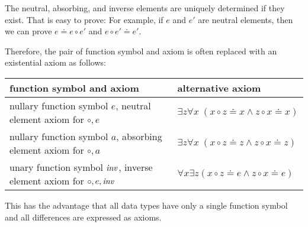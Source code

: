 \begin{remark}[Uniqueness]\label{rem:binaryfunc:unique}
The neutral, absorbing, and inverse elements are uniquely determined if they exist.
That is easy to prove: For example, if $e$ and $e'$ are neutral elements, then we can prove $e\doteq e\circ e'$ and $e\circ e'\doteq e'$.

Therefore, the pair of function symbol and axiom is often replaced with an existential axiom as follows:
 \begin{center}
  \begin{tabular}{|l|l|}
   \hline
   function symbol and axiom & alternative axiom \\
   \hline
   nullary function symbol $e$, neutral element axiom for $\circ,e$    & $\exists z \forall x\; (x \circ z \doteq x \wedge z \circ x \doteq x)$\\
   nullary function symbol $a$, absorbing element axiom for $\circ, a$ & $\exists z \forall x\; (x \circ z \doteq z \wedge z \circ x \doteq z)$\\
   unary function symbol $\mathit{inv}$, inverse element axiom for $\circ, e,\mathit{inv}$ & $\forall x\exists z (x \circ z \doteq e \wedge z \circ x \doteq e)$\\
   \hline
  \end{tabular}
 \end{center}
This has the advantage that all data types have only a single function symbol and all differences are expressed as axioms.
\end{remark}

